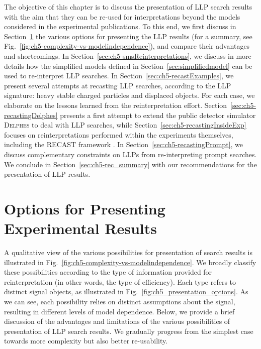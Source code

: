 The objective of this chapter is to discuss the presentation of  LLP search results
with the aim that they can be re-used for interpretations beyond the models considered in the
experimental publications.
To this end, we first discuss in Section~\ref{sec:ch5-options} the various options
for presenting the LLP results (for a summary, see Fig.~\ref{fig:ch5-complexity-vs-modelindependence}), and compare their advantages and
shortcomings.
In Section~\ref{sec:ch5-smsReinterpretations}, we discuss in more details how the simplified models defined in Section~\ref{sec:simplifiedmodel} can be used to re-interpret LLP searches.
In Section~\ref{sec:ch5-recastExamples}, we present several attempts at recasting LLP searches,
according to the LLP signature: heavy stable charged particles and displaced objects. For each case,
we elaborate on the lessons learned from the reinterpretation effort.
Section~\ref{sec:ch5-recastingDelphes} presents a first attempt to
extend the public detector simulator \textsc{Delphes} %
to deal with LLP searches, while
Section~\ref{sec:ch5-recastingInsideExp} focuses on reinterpretations performed within the experiments themselves,
including the RECAST framework \cite{Cranmer:2010hk}.
In Section~\ref{sec:ch5-recastingPrompt}, we discuss complementary constraints on LLPs from re-interpreting prompt searches.
We conclude in Section~\ref{sec:ch5-rec_summary} with our %
recommendations for the presentation of LLP results.


\section{Options for Presenting Experimental Results}
\label{sec:ch5-options}

A qualitative view of the various possibilities for presentation
of search results is illustrated in
Fig.~\ref{fig:ch5-complexity-vs-modelindependence}.
We broadly classify these possibilities according to the type of
information provided for reinterpretation (in other words, the type of efficiency).
Each type refers to distinct signal objects, as illustrated in
Fig.~\ref{fig:ch5_presentation_options}.
As we can see, each possibility relies on distinct assumptions about
the signal, resulting in different levels of model dependence.
Below, we provide a brief discussion of the advantages and limitations of the
various possibilities of presentation of LLP search results.
We  gradually progress from the simplest case towards more complexity but
also better re-usability.

